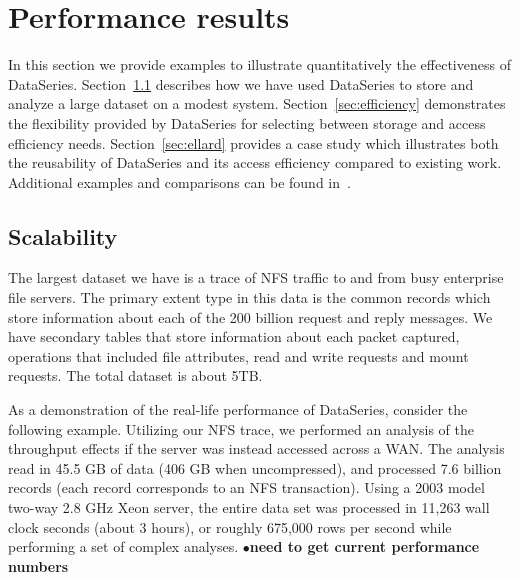 \documentclass{acm_proc_article-sp}
\newcommand{\fix}[1]{{\LARGE\ensuremath{\bullet}}\textbf{#1}}
\begin{document}
\section{Performance results}\label{sec:results}


In this section we provide examples to illustrate quantitatively the 
effectiveness of DataSeries.  
Section~\ref{sec:scale} describes how we have used DataSeries to store 
and analyze a large dataset on a modest system.
Section~\ref{sec:efficiency} demonstrates the flexibility provided
by DataSeries for selecting between storage and access efficiency needs.
Section~\ref{sec:ellard} provides a case study which illustrates
both the reusability of DataSeries and its access efficiency compared
to existing work.
Additional examples and comparisons can be found 
in~\cite{DSTechnicalReportSnapshot}.

\subsection{Scalability}\label{sec:scale}

The largest dataset we have is a trace of NFS traffic to and from
busy enterprise file servers.
The primary extent type 
in this data is the common records which store information about each
of the 200 billion request and reply messages. We have secondary tables that
store information about each packet captured, operations that included
file attributes, read and write requests and mount requests.  The total dataset
is about 5TB.

As a demonstration of the real-life performance of
DataSeries, consider the following example.  Utilizing our NFS
trace, we performed an analysis of the throughput
effects if the server was instead accessed across a WAN.
The analysis read in 45.5 GB of data (406 GB when uncompressed), and
processed 7.6 billion records (each record corresponds to an NFS
transaction).  Using a 2003 model two-way 2.8 GHz Xeon server, the
entire data set was processed in 11,263 wall clock seconds (about 3
hours), or roughly 675,000 rows per second while performing a set of complex
analyses. \fix{need to get current performance numbers}
\end{document}
